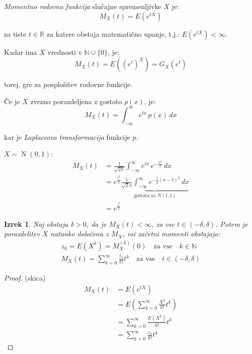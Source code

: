 \documentclass[12pt]{book}
\def\n{\noindent}
\theoremstyle{definition}
\theoremstyle{plain}
\newtheorem{izrek}{Izrek}
\theoremstyle{plain}
\theoremstyle{plain}
\theoremstyle{remark}
\begin{document}
\n \emph{Momentno rodovna funkcija} slučajne spremenljivke $X$ je: 
$$
M_X(t)=E\left(e^{t  X}\right)
$$

za tiste $t \in \mathbb{R}$ za katere obstaja matematično upanje, t.j.: $E\left(e^{t X}\right)<\infty$.

\n Kadar ima $X$ vrednosti v $\mathbb{N} \cup \{0\}$, je: 
$$
M_X(t)=E\left(\left(e^t\right)^X\right)=G_X\left(e^t\right)
$$

torej, gre za posplošitev rodovne funkcije. 

\n Če je $X$ zvezno porazdeljena z gostoto $p(x)$, je: 
$$
M_X(t)=\int_{-\infty}^{\infty} e^{t  x} \, p(x) \, d x
$$

kar je \emph{Laplaceova transformacija} funkcije $p$. 

\begin{zgled}
    $X \sim \operatorname{N}(0,1)$:
    $$
    \begin{aligned}
        M_X(t)&=\frac{1}{\sqrt{2 \pi}} \int_{-\infty}^{\infty} e^{t x} \, e^{-\frac{x^2}{2}} \,d x \\
        &=e^{\frac{t^2}{2}} \underbrace{\frac{1}{\sqrt{2} \pi} \int_{-\infty}^{\infty} e^{-\frac{1}{2}(x-t)^2} \, d x}_{\text {gostota za } N(t, 1)} \\
        &=e^{\frac{t^2}{2}}
    \end{aligned}
    $$
\end{zgled}

\begin{izrek}
    Naj obstaja $\delta > 0$, da je $M_X(t)<\infty$, za vse $t \in(-\delta, \delta)$. Potem je porazdelitev $X$ natanko določena z $M_X$, vsi začetni momenti obstajajo: 
    $$
    \begin{aligned}
        & z_k=E\left(X^k\right)=M_X^{(k)}(0) \quad \text {za vse} \quad  k \in \mathbb{N} & \\
        & M_X(t)=\sum_{k=0}^{\infty} \frac{z_k}{k !} t^k \quad \text{za vse} \quad {t \in(-\delta, \delta)} &
    \end{aligned}
    $$
\end{izrek}

\begin{proof}(skica)
    $$
    \begin{aligned}
        M_X(t)&=E\left(e^{t X}\right) \\
        &=E\left(\sum_{k=0}^{\infty} \frac{X^k}{k !}  t^k\right) \\
        &=\sum_{k=0}^{\infty} \frac{E\left(X^k\right)}{k !} t^k \\
        &=\sum_{k=0}^{\infty} \frac{z_k}{k !} t^k
    \end{aligned}
    $$
\end{proof}
\end{document}
